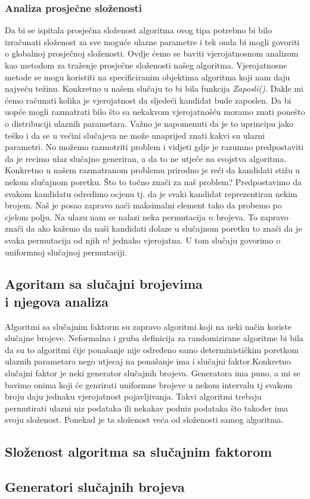 \documentclass[10pt,a4paper]{article}
\begin{document}
\subsubsection*{Analiza prosječne složenosti}
Da bi se ispitala prosječna složenost algoritma ovog tipa potrebno bi bilo izračunati složenost za sve 
moguće ulazne parametre i tek onda bi mogli govoriti o globalnoj prosječnoj složenosti. Ovdje ćemo se 
baviti vjerojatnosnom analizom kao metodom za traženje prosječne složenosti našeg algoritma. Vjerojatnosne 
metode se mogu koristiti na specificiranim objektima algoritma koji nam daju najveću težinu. Konkretno u našem 
slučaju to bi bila funkcija \textit{Zaposli()}. Dakle mi ćemo računati kolika je vjerojatnost da sljedeći kandidat 
bude zaposlen. Da bi uopće mogli razmatrati bilo što sa nekakvom vjerojatnošću moramo znati ponešto o distribuciji
ulaznih parametara. Važno je napomenuti da je to uprincipu jako teško i da se u većini slučajeva ne može unaprijed
znati kakvi su ulazni parametri. No možemo razmotriti problem i vidjeti gdje je razumno predpostaviti da je recimo
ulaz slučajno generiran, a da to ne utječe na svojstva algoritma. Konkretno u našem razmatranom problemu prirodno
je reći da kandidati stižu u nekom slučajnom poretku. Što to točno znači za naš problem?
Predpostavimo da svakom kandidatu odredimo ocjenu tj. da je svaki kandidat reprezentiran nekim brojem. Naš je posao 
zapravo naći maksimalni element tako da probemo po cjelom polju. Na ulazu nam se nalazi neka permutacija $n$ brojeva. 
To zapravo znači da ako kažemo da naši kandidati dolaze u slučajnom poretku to znači da je svaka permutacija od njih $n!$ 
jednako vjerojatna. U tom slučaju govorimo o uniformnoj slučajnoj permutaciji.
\subsection{Agoritam sa slučajni brojevima\\ i njegova analiza}
Algoritmi sa slučajnim faktorm su zapravo algoritmi koji na neki način koriste slučajne brojeve. Neformalna i gruba definicija 
za randomizirane algoritme bi bila da su to algoritmi čije ponašanje nije određeno samo determinističkim poretkom ulaznih 
parametara nego utjecaj na ponašanje ima i slučajni faktor.Konkretno slučajni faktor je neki generator slučajnih brojeva. 
Generatora ima puno, a mi se bavimo onima koji će genrirati uniformne brojeve u nekom intervalu tj svakom broju daju jednaku 
vjerojatnost pojavljivanja. Takvi algoritmi trebaju permutirati ulazni niz podataka ili nekakav podniz podataka što također 
ima svoju složenost. Ponekad je ta složenost veća od složenosti samog algoritma.

\subsection{Složenost algoritma sa slučajnim faktorom}

\subsection{Generatori slučajnih brojeva}

\end{document}
